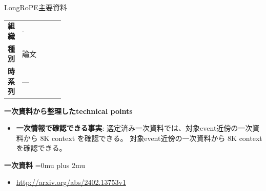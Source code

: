 \begin{technicalnote}{LongRoPE}{主要資料}
\begingroup
\begin{tabularx}{\linewidth}{@{}>{\bfseries}p{0.22\linewidth}X@{}}
組織 & - \\
種別 & 論文 \\
時系列 & — \\
\end{tabularx}
\smallskip
\begin{minipage}{\linewidth}
{\bfseries 一次資料から整理したtechnical points}
\begin{itemize}[leftmargin=1.5em,itemsep=0.35em]
\item \textbf{一次情報で確認できる事実}: 選定済み一次資料では、対象event近傍の一次資料から 8K context を確認できる。 対象event近傍の一次資料から 8K context を確認できる。
\end{itemize}
\begin{minipage}{\linewidth}
\begin{samepage}
{\bfseries 一次資料}
\begingroup\sloppy
\Urlmuskip=0mu plus 2mu\relax
\begin{itemize}[leftmargin=1.5em,itemsep=0.25em]
\item {\scriptsize\url{http://arxiv.org/abs/2402.13753v1}}
\end{itemize}
\endgroup
\end{samepage}
\end{minipage}
\end{minipage}
\endgroup
\end{technicalnote}
\medskip

